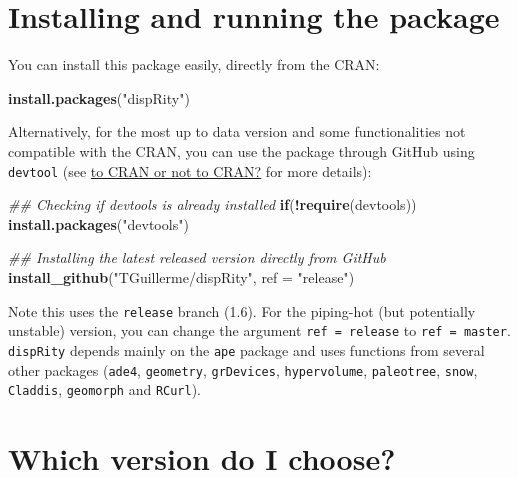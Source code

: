 \documentclass[]{book}
\newenvironment{Shaded}{\begin{snugshade}}{\end{snugshade}}
\newcommand{\CommentTok}[1]{\textcolor[rgb]{0.56,0.35,0.01}{\textit{#1}}}
\newcommand{\ControlFlowTok}[1]{\textcolor[rgb]{0.13,0.29,0.53}{\textbf{#1}}}
\newcommand{\DataTypeTok}[1]{\textcolor[rgb]{0.13,0.29,0.53}{#1}}
\newcommand{\KeywordTok}[1]{\textcolor[rgb]{0.13,0.29,0.53}{\textbf{#1}}}
\newcommand{\NormalTok}[1]{#1}
\newcommand{\OperatorTok}[1]{\textcolor[rgb]{0.81,0.36,0.00}{\textbf{#1}}}
\newcommand{\StringTok}[1]{\textcolor[rgb]{0.31,0.60,0.02}{#1}}
\begin{document}
\hypertarget{installing-and-running-the-package}{%
\section{Installing and running the package}\label{installing-and-running-the-package}}

You can install this package easily, directly from the CRAN:

\begin{Shaded}
\begin{Highlighting}[]
\KeywordTok{install.packages}\NormalTok{(}\StringTok{"dispRity"}\NormalTok{)}
\end{Highlighting}
\end{Shaded}

Alternatively, for the most up to data version and some functionalities not compatible with the CRAN, you can use the package through GitHub using \texttt{devtool} (see \protect\hyperlink{noCRAN}{to CRAN or not to CRAN?} for more details):

\begin{Shaded}
\begin{Highlighting}[]
\CommentTok{## Checking if devtools is already installed}
\ControlFlowTok{if}\NormalTok{(}\OperatorTok{!}\KeywordTok{require}\NormalTok{(devtools)) }\KeywordTok{install.packages}\NormalTok{(}\StringTok{"devtools"}\NormalTok{)}

\CommentTok{## Installing the latest released version directly from GitHub}
\KeywordTok{install_github}\NormalTok{(}\StringTok{"TGuillerme/dispRity"}\NormalTok{, }\DataTypeTok{ref =} \StringTok{"release"}\NormalTok{)}
\end{Highlighting}
\end{Shaded}

Note this uses the \texttt{release} branch (1.6).
For the piping-hot (but potentially unstable) version, you can change the argument \texttt{ref\ =\ release} to \texttt{ref\ =\ master}.
\texttt{dispRity} depends mainly on the \texttt{ape} package and uses functions from several other packages (\texttt{ade4}, \texttt{geometry}, \texttt{grDevices}, \texttt{hypervolume}, \texttt{paleotree}, \texttt{snow}, \texttt{Claddis}, \texttt{geomorph} and \texttt{RCurl}).

\hypertarget{version}{%
\section{Which version do I choose?}\label{version}}
\end{document}
